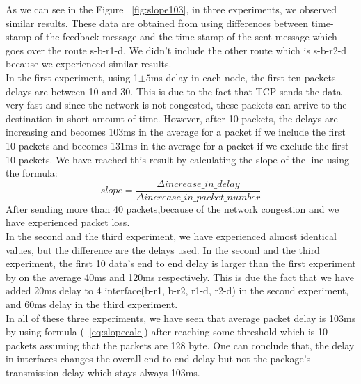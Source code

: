 \documentclass[12pt,journal,compsoc]{IEEEtran}
\begin{document}
As we can see in the Figure ~\ref{fig:slope103}, in three experiments, we observed similar results. These data are obtained from using differences between time-stamp of the feedback message and the time-stamp of the sent message which goes over the route s-b-r1-d. We didn't include the other route which is s-b-r2-d because we experienced similar results.\\
In the first experiment, using 1$\pm 5$ms delay in each node, the first ten packets delays are between 10 and 30. This is due to the fact that TCP sends the data very fast and since the network is not congested, these packets can arrive to the destination in short amount of time. However, after 10 packets, the delays are increasing and becomes 103ms in the average for a packet if we include the first 10 packets and becomes 131ms in the average for a packet if we exclude the first 10 packets. We have reached this result by calculating the slope of the line using the formula:
\begin{equation}
\label{eq:slopecalc}
 slope = \frac{\Delta increase\_in\_delay}{\Delta increase\_in\_packet\_number}
\end{equation}
After sending more than 40 packets,because of the network congestion and we have experienced packet loss.\\
In the second and the third experiment, we have experienced almost identical values, but the difference are the delays used. In the second and the third experiment, the first 10 data's end to end delay is larger than the first experiment by on the average 40ms and 120ms respectively. This is due the fact that we have added 20ms delay to 4 interface(b-r1, b-r2, r1-d, r2-d) in the second experiment, and 60ms delay in the third experiment.\\
In all of these three experiments, we have seen that average packet delay is 103ms by using formula (~\ref{eq:slopecalc}) after reaching some threshold which is 10 packets assuming that the packets are 128 byte. One can conclude that, the delay in interfaces changes the overall end to end delay but not the package's transmission delay which stays always 103ms.
\end{document}
